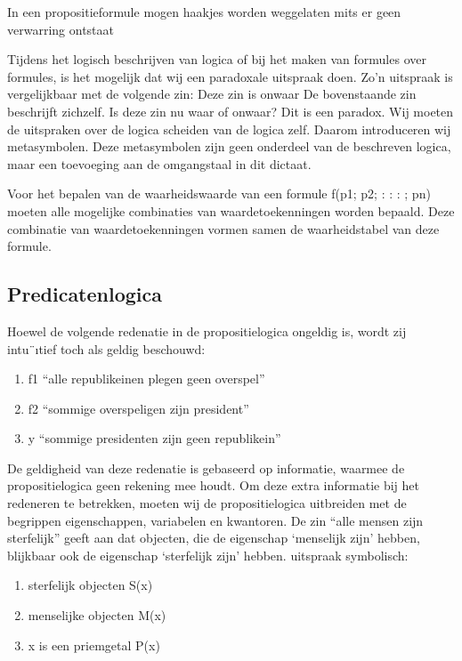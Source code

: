 \documentclass{article}
\begin{document}
	In een propositieformule mogen haakjes worden weggelaten mits er geen verwarring ontstaat
	
	Tijdens het logisch beschrijven van logica of bij het maken van formules over formules, is
	het mogelijk dat wij een paradoxale uitspraak doen. Zo’n uitspraak is vergelijkbaar met
	de volgende zin:
	Deze zin is onwaar
	De bovenstaande zin beschrijft zichzelf. Is deze zin nu waar of onwaar? Dit is een paradox.
	Wij moeten de uitspraken over de logica scheiden van de logica zelf. Daarom introduceren
	wij metasymbolen. Deze metasymbolen zijn geen onderdeel van de beschreven logica,
	maar een toevoeging aan de omgangstaal in dit dictaat.
	
	Voor het bepalen van de waarheidswaarde van een formule f(p1; p2; : : : ; pn) moeten alle
	mogelijke combinaties van waardetoekenningen worden bepaald. Deze combinatie van
	waardetoekenningen vormen samen de waarheidstabel van deze formule.
	
	
	\subsection{Predicatenlogica}
	
	Hoewel de volgende redenatie in de propositielogica ongeldig is, wordt zij intu¨ıtief toch
	als geldig beschouwd:
	\begin{enumerate}
		\item f1 “alle republikeinen plegen geen overspel”
		\item f2 “sommige overspeligen zijn president”
		\item y “sommige presidenten zijn geen republikein”
	\end{enumerate}
	De geldigheid van deze redenatie is gebaseerd op informatie, waarmee de propositielogica
	geen rekening mee houdt. Om deze extra informatie bij het redeneren te betrekken,
	moeten wij de propositielogica uitbreiden met de begrippen eigenschappen, variabelen en
	kwantoren. De zin “alle mensen zijn sterfelijk” geeft aan dat objecten, die de eigenschap
	‘menselijk zijn’ hebben, blijkbaar ook de eigenschap ‘sterfelijk zijn’ hebben.
	uitspraak symbolisch:
	
	\begin{enumerate}
		\item sterfelijk objecten S(x)
		\item menselijke objecten M(x)
		\item x is een priemgetal P(x)
	\end{enumerate}
	
\end{document}
